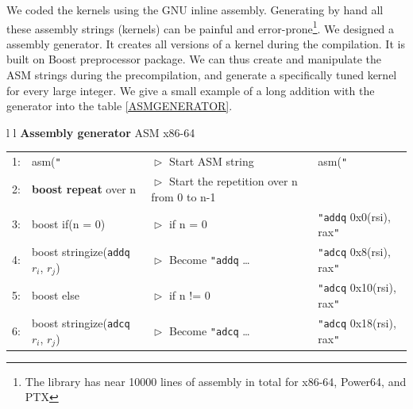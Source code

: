 \documentclass[oribibl]{llncs2e/llncs}
\begin{document}
We coded the kernels using the GNU inline assembly.
Generating by hand all these  assembly strings (kernels)  can be painful and error-prone\footnote{The library has near 10000 lines of assembly in total for x86-64, Power64, and PTX}.
We designed a assembly generator. It creates all versions of a kernel during the compilation.   
It is built on Boost preprocessor package. We can thus create and manipulate the ASM strings during the precompilation, 
and generate a specifically tuned kernel for every large integer. We give a small example of a long addition with the generator into the table \ref{ASMGENERATOR}.

 \begin{table}[h] 
	\begin{center}
	 	\begin{tabular}{l l}
                           \hline 
                           \textbf{Assembly generator}      \hspace{8.5 cm}  ASM  x86-64 \\ \hline
                           \begin{tabular}{l l l l } 
                               \tiny{1:} &  asm(\texttt{"}     &  $\vartriangleright$ Start ASM string & asm(\texttt{"} \\
                               \tiny{2:} &  \textbf{boost  repeat} over n  &$\vartriangleright$  Start the repetition over n from 0 to n-1 &   \\
                               \tiny{3:} &   \hspace{0.2 cm}  boost  if(n = 0) &  $\vartriangleright$   if n = 0 &  \hspace{0.2 cm}  \texttt{"}\texttt{addq} 0x0(rsi), rax\texttt{"}\\    
                               \tiny{4:} &   \hspace{0.4 cm}  boost stringize(\texttt{addq}  $r_i$, $r_j$)  &$\vartriangleright$   Become \texttt{"addq} \dots &  \hspace{0.2 cm}    \texttt{"}\texttt{adcq}  0x8(rsi), rax\texttt{"}\\    
                               \tiny{5:} &   \hspace{0.2 cm}  boost  else  & $\vartriangleright$   if n != 0 &  \hspace{0.2 cm}  \texttt{"}\texttt{adcq}  0x10(rsi), rax\texttt{"} \\ 
                               \tiny{6:} &   \hspace{0.4 cm}  boost stringize(\texttt{adcq}  $r_i$, $r_j$)  &$\vartriangleright$   Become \texttt{"adcq} \dots &  \hspace{0.2 cm}   \texttt{"}\texttt{adcq}  0x18(rsi), rax\texttt{"}\\     

\end{tabular}
\end{tabular}
\end{center}
\end{table}
\end{document}
